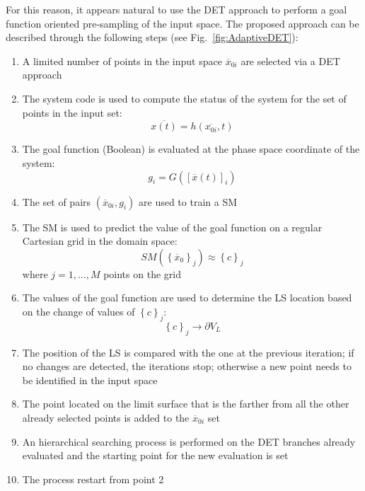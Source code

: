 \documentclass{anstrans}
\begin{document}
For this reason, it appears natural to use the DET approach to perform a goal function oriented pre-sampling of the input space. The proposed approach can be described through the following steps (see Fig.~\ref{fig:AdaptiveDET}):
\begin{enumerate} 
\item A limited number of points in the input space $\overline{x}_{0i}$ are selected via a DET approach
\item The system code is used to compute the status of the system for the set of points in the input set:
\begin{equation}
    \overline{x(t)}=h(\overline{x_{0i}},t)
\end{equation}
\item The goal function (Boolean) is evaluated at the phase space coordinate of the system: 
\begin{equation}
g_{i}=G([\overline{x}(t)]_{i})
\end{equation}
\item The set of pairs $(\overline{x}_{0i},g_{i})$ are used to train a SM
\item The SM is used to predict the value of the goal function on a regular Cartesian grid in the domain space:
\begin{equation}
SM\left ( \left \{ \overline{x}_{0} \right \}_{j} \right ) \approx \left \{ c \right \}_{j}
\end{equation}
where $j=1, ..., M$ points on the grid 
\item The values of the goal function are used to determine the LS location based on the change of values of $\left \{ c \right \}_{j}$:
\begin{equation}
\left \{ c \right \}_{j} \rightarrow \partial V_{L}
\end{equation}
\item The position of the LS is compared with the one at the previous iteration; if no changes are detected, the iterations stop; otherwise a new point needs to be identified in the input space
\item The point located on the limit surface that is the farther from all the other already selected points is added to the $\overline{x}_{0i}$ set 
\item An hierarchical searching process is performed on the DET branches already evaluated and the starting point for the new evaluation is set
\item The process restart from point 2
\end{enumerate}
\end{document}

